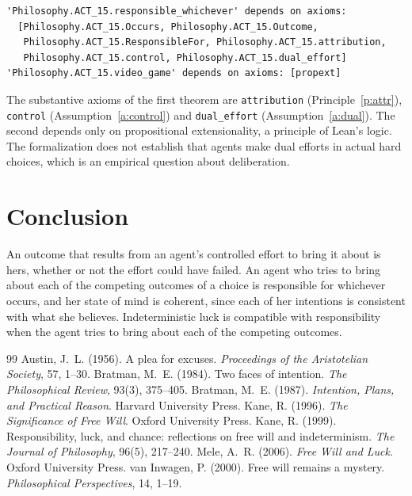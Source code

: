 \documentclass{situationist-preprint}
\begin{document}
\begin{lstlisting}
'Philosophy.ACT_15.responsible_whichever' depends on axioms:
  [Philosophy.ACT_15.Occurs, Philosophy.ACT_15.Outcome,
   Philosophy.ACT_15.ResponsibleFor, Philosophy.ACT_15.attribution,
   Philosophy.ACT_15.control, Philosophy.ACT_15.dual_effort]
'Philosophy.ACT_15.video_game' depends on axioms: [propext]
\end{lstlisting}

The substantive axioms of the first theorem are \texttt{attribution} (Principle~\ref{p:attr}), \texttt{control} (Assumption~\ref{a:control}) and \texttt{dual\_effort} (Assumption~\ref{a:dual}). The second depends only on propositional extensionality, a principle of Lean's logic. The formalization does not establish that agents make dual efforts in actual hard choices, which is an empirical question about deliberation.

\section{Conclusion}

An outcome that results from an agent's controlled effort to bring it about is hers, whether or not the effort could have failed. An agent who tries to bring about each of the competing outcomes of a choice is responsible for whichever occurs, and her state of mind is coherent, since each of her intentions is consistent with what she believes. Indeterministic luck is compatible with responsibility when the agent tries to bring about each of the competing outcomes.

\begin{thebibliography}{99}\small
{} Austin, J.~L. (1956). A plea for excuses. \emph{Proceedings of the Aristotelian Society}, 57, 1--30.
 Bratman, M.~E. (1984). Two faces of intention. \emph{The Philosophical Review}, 93(3), 375--405.
 Bratman, M.~E. (1987). \emph{Intention, Plans, and Practical Reason}. Harvard University Press.
 Kane, R. (1996). \emph{The Significance of Free Will}. Oxford University Press.
 Kane, R. (1999). Responsibility, luck, and chance: reflections on free will and indeterminism. \emph{The Journal of Philosophy}, 96(5), 217--240.
 Mele, A.~R. (2006). \emph{Free Will and Luck}. Oxford University Press.
 van Inwagen, P. (2000). Free will remains a mystery. \emph{Philosophical Perspectives}, 14, 1--19.
\end{thebibliography}
\end{document}

